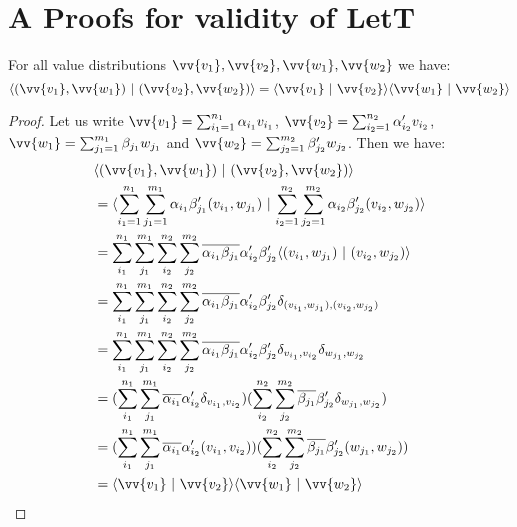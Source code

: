 \documentclass[runningheads,orivec,envcountsame,envcountsect]{llncs}
\def\scal#1#2{\langle{#1}~|~{#2}\rangle}
\def\Pair#1#2{(#1,#2)} %
\def\Kron#1#2{\ensuremath{\delta_{#1,#2}}}
\begin{document}
\section{A Proofs for validity of LetT}

\begin{theorem}\label{prop:InnerProdPairs} For all value distributions $\vv{v_1}, \vv{v_2}, \vv{w_1}, \vv{w_2}$ we have:
\[
\scal{\Pair{\vv{v_1}}{\vv{w_1}}}{\Pair{\vv{v_2}}{\vv{w_2}}} = \scal{\vv{v_1}}{\vv{v_2}}\scal{\vv{w_1}}{\vv{w_2}}
\]
\begin{proof}
    Let us write $\vv{v_1}=\sum_{i_1=1}^{n_1}\alpha_{i_1} v_{i_1}$, $\vv{v_2}=\sum_{i_2=1}^{n_2}\alpha'_{i_2} v_{i_2}$, $\vv{w_1}=\sum_{j_1=1}^{m_1}\beta_{j_1} w_{j_1}$ and $\vv{w_2}=\sum_{j_2=1}^{m_2}\beta'_{j_2} w_{j_2}$. Then we have:
    \begin{align*}
        &\scal{\Pair{\vv{v_1}}{\vv{w_1}}}{\Pair{\vv{v_2}}{\vv{w_2}}}\\
        &=\scal{\sum_{i_1=1}^{n_1}\sum_{j_1=1}^{m_1} \alpha_{i_1}\beta'_{j_1}\Pair{v_{i_1}}{w_{j_1}}}{\sum_{i_2=1}^{n_2}\sum_{j_2=1}^{m_2} \alpha_{i_2}\beta'_{j_2}\Pair{v_{i_2}}{w_{j_2}}}\\
        &=\sum_{i_1}^{n_1}\sum_{j_1}^{m_1}\sum_{i_2}^{n_2}\sum_{j_2}^{m_2} \overline{\alpha_{i_1}\beta_{j_1}} \alpha'_{i_2}\beta'_{j_2} \scal{\Pair{v_{i_1}}{w_{j_1}}}{\Pair{v_{i_2}}{w_{j_2}}}\\
        &=\sum_{i_1}^{n_1}\sum_{j_1}^{m_1}\sum_{i_2}^{n_2}\sum_{j_2}^{m_2} \overline{\alpha_{i_1}\beta_{j_1}} \alpha'_{i_2}\beta'_{j_2} \Kron{\Pair{v_{i_1}}{w_{j_1}}}{\Pair{v_{i_2}}{w_{j_2}}}\\
        &=\sum_{i_1}^{n_1}\sum_{j_1}^{m_1}\sum_{i_2}^{n_2}\sum_{j_2}^{m_2} \overline{\alpha_{i_1}\beta_{j_1}} \alpha'_{i_2}\beta'_{j_2} \Kron{v_{i_1}}{v_{i_2}}\Kron{w_{j_1}}{w_{j_2}}\\
        &=(\sum_{i_1}^{n_1}\sum_{j_1}^{m_1}\overline{\alpha_{i_1}}\alpha'_{i_2}\Kron{v_{i_1}}{v_{i_2}})(\sum_{i_2}^{n_2}\sum_{j_2}^{m_2} \overline{\beta_{j_1}} \beta'_{j_2} \Kron{w_{j_1}}{w_{j_2}})\\
        &=(\sum_{i_1}^{n_1}\sum_{j_1}^{m_1}\overline{\alpha_{i_1}}\alpha'_{i_2}\Pair{v_{i_1}}{v_{i_2}})(\sum_{i_2}^{n_2}\sum_{j_2}^{m_2} \overline{\beta_{j_1}} \beta'_{j_2} \Pair{w_{j_1}}{w_{j_2}})\\
        &=\scal{\vv{v_1}}{\vv{v_2}}\scal{\vv{w_1}}{\vv{w_2}}\\
    \end{align*}
\end{proof}  

\end{theorem}
\end{document}
